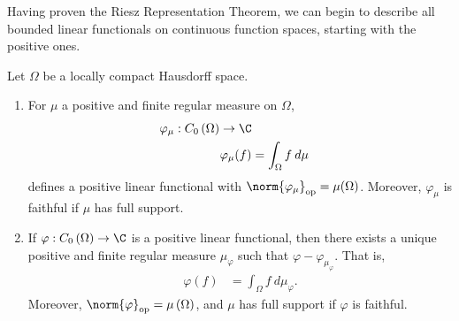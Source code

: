 \documentclass[10pt]{mypackage}
\begin{document}
Having proven the Riesz Representation Theorem, we can begin to describe all bounded linear functionals on continuous function spaces, starting with the positive ones.
\begin{proposition}
  Let $\Omega$ be a locally compact Hausdorff space.
  \begin{enumerate}[(1)]
    \item For $\mu$ a positive and finite regular measure on $\Omega$,
      \begin{align*}
        \varphi_{\mu}: C_0\left(\Omega\right)\rightarrow \C\\
        \varphi_{\mu}(f) &= \int_{\Omega}f\:d\mu
      \end{align*}
      defines a positive linear functional with $\norm{\varphi_{\mu}}_{\text{op}} = \mu\!\left(\Omega\right)$. Moreover, $\varphi_{\mu}$ is faithful if $\mu$ has full support.
    \item If $\varphi: C_0\left(\Omega\right)\rightarrow \C$ is a positive linear functional, then there exists a unique positive and finite regular measure $\mu_{\varphi}$ such that $\varphi - \varphi_{\mu_{\varphi}}$. That is,
      \begin{align*}
        \varphi(f) &= \int_{\Omega}f\:d\mu_{\varphi}.
      \end{align*}
      Moreover, $\norm{\varphi}_{\text{op}} = \mu\left(\Omega\right)$, and $\mu$ has full support if $\varphi$ is faithful.
  \end{enumerate}
\end{proposition}
\end{document}
